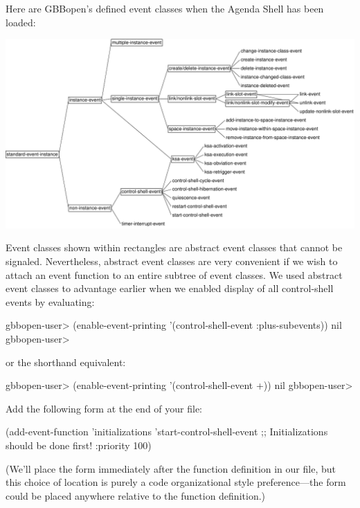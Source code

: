 \documentclass[10pt,twoside,english,pdftex]{article}
\begin{document}
Here are GBBopen's defined event classes when the Agenda Shell has
been loaded:
%
\T\begin{ifhtml}
\T\end{ifhtml}
\W\begin{iftex} 
\begin{center}
\includegraphics[scale=0.85]{agenda-shell-events}
\end{center}
\W\end{iftex}
%
Event classes shown within rectangles are abstract event classes that cannot
be signaled.  Nevertheless, abstract event classes are very convenient if we
wish to attach an event function to an entire subtree of event classes.  We
used abstract event classes to advantage earlier when we enabled display of
all control-shell events by evaluating:
%
\W\supp
\begin{example}
\textcolor{darkergray}{%
  gbbopen-user> (enable-event-printing '(control-shell-event :plus-subevents))
  nil
  gbbopen-user>}
\end{example}
%
or the shorthand equivalent:
%
\W\supp\notpretop
\begin{example}
\textcolor{darkergray}{%
  gbbopen-user> (enable-event-printing '(control-shell-event +))
  nil
  gbbopen-user>}
\end{example}

Add the following form at the end of your 
file:
%
\W\supp
\begin{example}
  (add-event-function 'initializations 'start-control-shell-event
                      ;; Initializations should be done first!
                      :priority 100)
\end{example}
%
(We'll place the  form immediately after the
 function definition in our file, but this choice
of location is purely a code organizational style preference---the form could
be placed anywhere relative to the function definition.)
\end{document}
